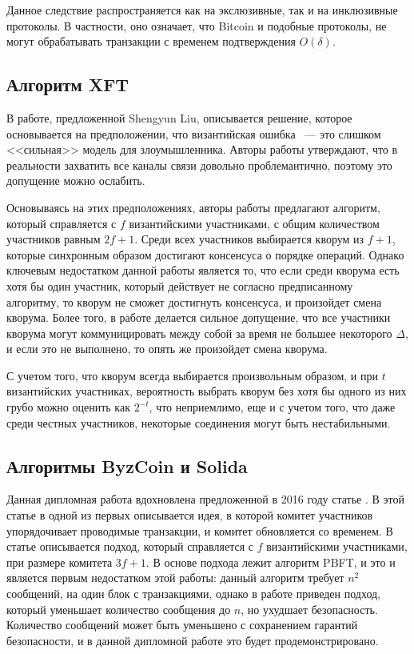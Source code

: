 Данное следствие распространяется как на экслюзивные, так и на инклюзивные протоколы. 
В частности, оно означает, что Bitcoin и подобные протоколы, не могут обрабатывать транзакции с временем подтверждения $O(\delta)$.

\subsection{Алгоритм XFT}
В работе\cite{DBLP:journals/corr/LiuCQV15}, предложенной  Shengyun Liu, описывается решение, которое основывается на предположении, что византийская ошибка ~--- это слишком <<сильная>> модель для злоумышленника. Авторы работы утверждают, что в реальности захватить все каналы связи довольно проблемантично, поэтому это допущение можно ослабить.

Основываясь на этих предположениях, авторы работы предлагают алгоритм, который справляется с $f$ византийскими участниками, с общим количеством участников равным $2f+1$. Среди всех участников выбирается кворум из $f+1$, которые синхронным образом достигают консенсуса о порядке операций.
Однако ключевым недостатком данной работы является то, что если среди кворума есть хотя бы один участник, который действует не согласно предписанному алгоритму, то кворум не сможет достигнуть консенсуса, и произойдет смена кворума. Более того, в работе делается сильное допущение, что все участники кворума могут коммуницировать между собой за время не большее некоторого $\Delta$, и если это не выполнено, то опять же произойдет смена кворума.

С учетом того, что кворум всегда выбирается произвольным образом, и при $t$ византийских участниках, вероятность выбрать кворум без хотя бы одного из них грубо можно оценить как $2^{-t}$, что неприемлимо, еще и с учетом того, что даже среди честных участников, некоторые соединения могут быть нестабильными.

\subsection{Алгоритмы ByzCoin и Solida}
Данная дипломная работа вдохновлена предложенной в 2016 году статье \cite{byzcoin}. В этой статье в одной из первых описывается идея, в которой комитет участников упорядочивает проводимые транзакции, и комитет обновляется со временем. В статье описывается подход, который справляется с $f$ византийскими участниками, при размере комитета $3f+1$. В основе подхода лежит алгоритм PBFT\cite{pbft}, и это и является первым недостатком этой работы: данный алгоритм требует $n^2$ сообщений, на один блок с транзакциями, однако в работе приведен подход, который уменьшает количество сообщения до $n$, но ухудшает безопасность. Количество сообщений может быть уменьшено с сохранением гарантий безопасности, и в данной дипломной работе это будет продемонстрировано.

